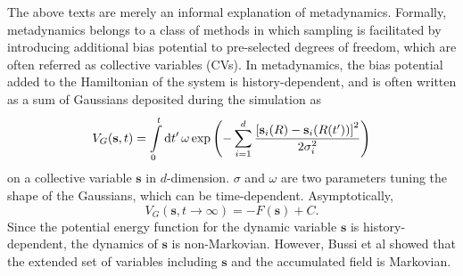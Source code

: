 
The above texts are merely an informal explanation of metadynamics. Formally, metadynamics belongs to a class of methods in which sampling is facilitated by introducing additional bias potential to pre-selected degrees of freedom, which are often referred as collective variables (CVs). In metadynamics, the bias potential added to the Hamiltonian of the system is history-dependent, and is often written as a sum of Gaussians deposited during the simulation as
\begin{equation}
   V_G(\mathbf{s},t) = \int\limits_0^t\mathop{}\!\mathrm{d} t^\prime\, \omega\exp{\left(-\sum\limits_{i=1}^{d}\frac{\left[\mathbf{s}_i(R)-\mathbf{s}_i(R(t^\prime))\right]^2}{2\sigma_i^2}\right)}
\end{equation}
on a collective variable $\mathbf{s}$ in $d$-dimension. $\sigma$ and $\omega$ are two parameters tuning the shape of the Gaussians, which can be time-dependent. Asymptotically, 
\begin{equation}
   V_G(\mathbf{s},t\rightarrow \infty) = -F(\mathbf{s})+C.
\end{equation}
Since the potential energy function for the dynamic variable $\mathbf{s}$ is history-dependent, the dynamics of $\mathbf{s}$ is non-Markovian. However, Bussi et al showed that the extended set of variables including $\mathbf{s}$ and the accumulated field is Markovian.\cite{BussiPRL2006}

